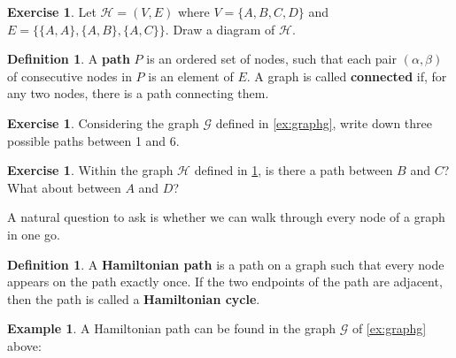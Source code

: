 \documentclass[a4paper]{amsart}
\theoremstyle{definition}
\newtheorem{defn}[thm]{Definition}
\newtheorem{ex}[thm]{Example}
\newtheorem{exercise}[thm]{Exercise}
\theoremstyle{remark}
\begin{document}
\begin{exercise}\label{ex:graphh}
  Let $ \mathcal{H} = (V, E) $ where $ V = \{A, B, C, D\} $ and $ E = \{ \{A, A\},\allowbreak \{A, B\},\allowbreak \{A, C\} \} $. Draw a diagram of $ \mathcal{H} $.
\end{exercise}

\begin{defn}
  A \textbf{path} $ P $ is an ordered set of nodes, such that each pair $ (\alpha, \beta) $ of consecutive nodes in $ P $ is an element of $ E $.
  A graph is called \textbf{connected} if, for any two nodes, there is a path connecting them.
\end{defn}

\begin{exercise}
  Considering the graph $ \mathcal{G} $ defined in \cref{ex:graphg}, write down three possible paths between 1 and 6.
\end{exercise}

\begin{exercise}
  Within the graph $ \mathcal{H} $ defined in \cref{ex:graphh}, is there a path between $ B $ and $ C $? What about between $ A $ and $ D $?
\end{exercise}

A natural question to ask is whether we can walk through every node of a graph in one go.

\begin{defn}
  A \textbf{Hamiltonian path} is a path on a graph such that every node appears on the path exactly once. If the two endpoints
  of the path are adjacent, then the path is called a \textbf{Hamiltonian cycle}.
\end{defn}

\begin{ex}
  A Hamiltonian path can be found in the graph $ \mathcal{G} $ of \cref{ex:graphg} above:
  \begin{center}
  \end{center}
\end{ex}
\end{document}

